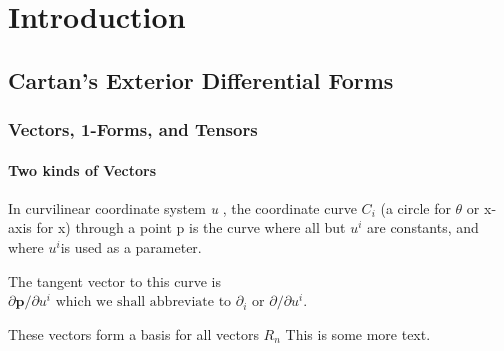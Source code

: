 \chapter{Introduction}

\section{Cartan's Exterior Differential Forms}


\subsection{Vectors, 1-Forms, and Tensors}

\subsubsection{Two kinds of Vectors}

In curvilinear coordinate system \textit{u} , the coordinate curve $C_{i}$ (a circle for $\theta$ or x-axis for x) through a point p is the curve where all but $\textit{u}^i$ are constants, and where $\textit{u}^i $is used as a parameter.
 
The tangent vector to this curve is $\partial \mathbf { p } / \partial u ^ { i } \text { which we shall abbreviate to } \partial _ { i } \text { or } \partial / \partial u ^ { i }$.

These vectors form a basis for all vectors $R_n$
This is some more text.



